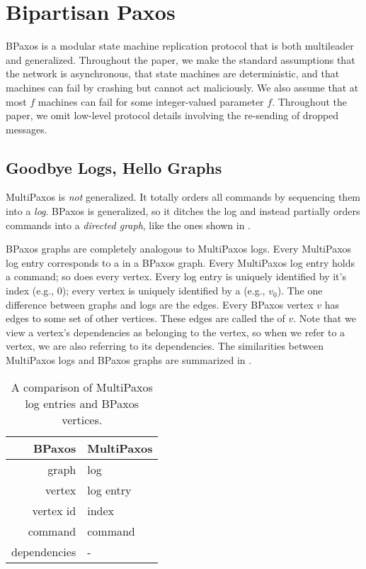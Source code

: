 \section{Bipartisan Paxos}
BPaxos is a modular state machine replication protocol that is both multileader
and generalized. Throughout the paper, we make the standard assumptions that
the network is asynchronous, that state machines are deterministic, and that
machines can fail by crashing but cannot act maliciously. We also assume that
at most $f$ machines can fail for some integer-valued parameter $f$. Throughout
the paper, we omit low-level protocol details involving the re-sending of
dropped messages.

\subsection{Goodbye Logs, Hello Graphs}
MultiPaxos is \emph{not} generalized. It totally orders all commands by
sequencing them into a \emph{log}. BPaxos is generalized, so it ditches the log
and instead partially orders commands into a \emph{directed graph}, like the
ones shown in .

BPaxos graphs are completely analogous to MultiPaxos logs. Every MultiPaxos log
entry corresponds to a  in a BPaxos graph. Every MultiPaxos log
entry holds a command; so does every vertex. Every log entry is uniquely
identified by it's index (e.g., \textcolor{flatred}{$0$}); every vertex is
uniquely identified by a  (e.g.,
\textcolor{flatred}{$v_0$}). The one difference between graphs and logs are the
edges. Every BPaxos vertex $v$ has edges to some set of other vertices. These
edges are called the  of $v$. Note that we view a
vertex's dependencies as belonging to the vertex, so when we refer to a vertex,
we are also referring to its dependencies. The similarities between MultiPaxos
logs and BPaxos graphs are summarized in .

\begin{table}[ht]
  \centering
  \caption{A comparison of MultiPaxos log entries and BPaxos vertices.}
  \begin{tabular}{r|l}
    \textbf{BPaxos} & \textbf{MultiPaxos} \\\hline
    graph           & log \\
    vertex          & log entry \\
    vertex id       & index \\
    command         & command \\
    dependencies    & - \\
  \end{tabular}
\end{table}

